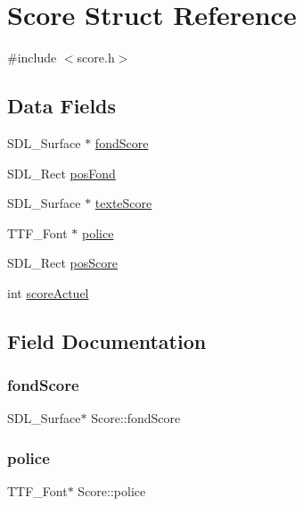 \hypertarget{structScore}{}\section{Score Struct Reference}
\label{structScore}


{\ttfamily \#include $<$score.\+h$>$}

\subsection*{Data Fields}
\begin{DoxyCompactItemize}
\item 
S\+D\+L\+\_\+\+Surface $\ast$ \hyperlink{structScore_aea0f2011fc97c3a7776635a84b76fe67}{fond\+Score}
\item 
S\+D\+L\+\_\+\+Rect \hyperlink{structScore_a578e743bcee6d68e53de231fd0f0dbbf}{pos\+Fond}
\item 
S\+D\+L\+\_\+\+Surface $\ast$ \hyperlink{structScore_ae9a968b720621f536298fd15749463e2}{texte\+Score}
\item 
T\+T\+F\+\_\+\+Font $\ast$ \hyperlink{structScore_a7887e4dd262c08a37b568f3aa5ad30e2}{police}
\item 
S\+D\+L\+\_\+\+Rect \hyperlink{structScore_a163319fdcee50a9d6ff99dad49809ae9}{pos\+Score}
\item 
int \hyperlink{structScore_a1dc9e9448e13b692f49293078e2db059}{score\+Actuel}
\end{DoxyCompactItemize}


\subsection{Field Documentation}
\mbox{\label{structScore_aea0f2011fc97c3a7776635a84b76fe67}} 
\subsubsection{\texorpdfstring{fond\+Score}{fondScore}}
{\footnotesize\ttfamily S\+D\+L\+\_\+\+Surface$\ast$ Score\+::fond\+Score}

\mbox{\label{structScore_a7887e4dd262c08a37b568f3aa5ad30e2}} 
\subsubsection{\texorpdfstring{police}{police}}
{\footnotesize\ttfamily T\+T\+F\+\_\+\+Font$\ast$ Score\+::police}

